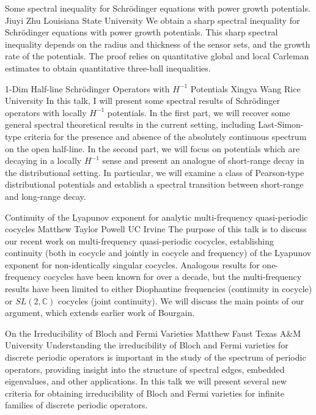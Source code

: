 \begin{addmargin}[2em]{0em}
\vspace{2ex}
\abs
{Some spectral inequality for Schrödinger equations with power growth potentials.}
{Jiuyi Zhu}
{Louisiana State University}
{We obtain a sharp spectral inequality for Schrödinger equations with power growth potentials. This sharp spectral inequality depends on the radius and thickness of the sensor sets, and the growth rate of the potentials. The proof relies on quantitative global and local Carleman estimates to obtain quantitative three-ball inequalities.}


\vspace{1.5ex}
\abs
{1-Dim Half-line Schrödinger Operators with $H^{-1}$ Potentials}
{Xingya Wang}
{Rice University}
{In this talk, I will present some spectral results of Schrödinger operators with locally $H^{-1}$ potentials. In the first part, we will recover some general spectral theoretical results in the current setting, including Last-Simon-type criteria for the presence and absence of the absolutely continuous spectrum on the open half-line. In the second part, we will focus on potentials which are decaying in a locally $H^{-1}$ sense and present an analogue of short-range decay in the distributional setting. In particular, we will examine a class of Pearson-type distributional potentials and establish a spectral transition between short-range and long-range decay.}


\vspace{1.5ex}
\abs
{Continuity of the Lyapunov exponent for analytic multi-frequency quasi-periodic cocycles}
{Matthew Taylor Powell}
{UC Irvine}
{The purpose of this talk is to discuss our recent work on multi-frequency quasi-periodic cocycles, establishing continuity (both in cocycle and jointly in cocycle and frequency) of the Lyapunov exponent for non-identically singular cocycles. Analogous results for one-frequency cocycles have been known for over a decade, but the multi-frequency results have been limited to either Diophantine frequencies (continuity in cocycle) or $SL(2,\mathbb{C})$ cocycles (joint continuity). We will discuss the main points of our argument, which extends earlier work of Bourgain.}


\vspace{1.5ex}
\abs
{On the Irreducibility of Bloch and Fermi Varieties}
{Matthew Faust}
{Texas A\&M University}
{Understanding the irreducibility of Bloch and Fermi varieties for discrete periodic operators is important in the study of the spectrum of periodic operators, providing insight into the structure of spectral edges, embedded eigenvalues, and other applications.  In this talk we will present several new criteria for obtaining irreducibility of Bloch and Fermi varieties for infinite families of discrete periodic operators.}



\end{addmargin}
